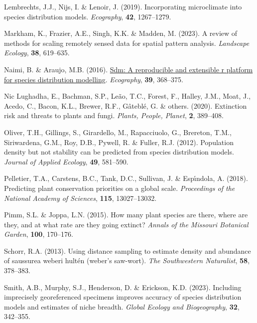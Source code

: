 \documentclass[
]{article}
\newlength{\cslhangindent}
\newlength{\cslentryspacingunit} %
\newenvironment{CSLReferences}[2] %
 {%
  \setlength{\parindent}{0pt}
  \ifodd #1
  \let\oldpar\par
  \def\par{\hangindent=\cslhangindent\oldpar}
  \fi
  \setlength{\parskip}{#2\cslentryspacingunit}
 }%
 {}
\begin{document}
\begin{CSLReferences}{1}{0}
\leavevmode{}%
Lembrechts, J.J., Nijs, I. \& Lenoir, J. (2019). Incorporating
microclimate into species distribution models. \emph{Ecography},
\textbf{42}, 1267--1279.

\leavevmode{}%
Markham, K., Frazier, A.E., Singh, K.K. \& Madden, M. (2023). A review
of methods for scaling remotely sensed data for spatial pattern
analysis. \emph{Landscape Ecology}, \textbf{38}, 619--635.

\leavevmode{}%
Naimi, B. \& Araujo, M.B. (2016).
\href{https://doi.org/10.1111/ecog.01881}{Sdm: A reproducible and
extensible r platform for species distribution modelling}.
\emph{Ecography}, \textbf{39}, 368--375.

\leavevmode{}%
Nic Lughadha, E., Bachman, S.P., Leão, T.C., Forest, F., Halley, J.M.,
Moat, J., Acedo, C., Bacon, K.L., Brewer, R.F., Gâteblé, G. \& others.
(2020). Extinction risk and threats to plants and fungi. \emph{Plants,
People, Planet}, \textbf{2}, 389--408.

\leavevmode{}%
Oliver, T.H., Gillings, S., Girardello, M., Rapacciuolo, G., Brereton,
T.M., Siriwardena, G.M., Roy, D.B., Pywell, R. \& Fuller, R.J. (2012).
Population density but not stability can be predicted from species
distribution models. \emph{Journal of Applied Ecology}, \textbf{49},
581--590.

\leavevmode{}%
Pelletier, T.A., Carstens, B.C., Tank, D.C., Sullivan, J. \& Espı́ndola,
A. (2018). Predicting plant conservation priorities on a global scale.
\emph{Proceedings of the National Academy of Sciences}, \textbf{115},
13027--13032.

\leavevmode{}%
Pimm, S.L. \& Joppa, L.N. (2015). How many plant species are there,
where are they, and at what rate are they going extinct? \emph{Annals of
the Missouri Botanical Garden}, \textbf{100}, 170--176.

\leavevmode{}%
Schorr, R.A. (2013). Using distance sampling to estimate density and
abundance of saussurea weberi hult{é}n (weber's saw-wort). \emph{The
Southwestern Naturalist}, \textbf{58}, 378--383.

\leavevmode{}%
Smith, A.B., Murphy, S.J., Henderson, D. \& Erickson, K.D. (2023).
Including imprecisely georeferenced specimens improves accuracy of
species distribution models and estimates of niche breadth. \emph{Global
Ecology and Biogeography}, \textbf{32}, 342--355.


\end{CSLReferences}
\end{document}
